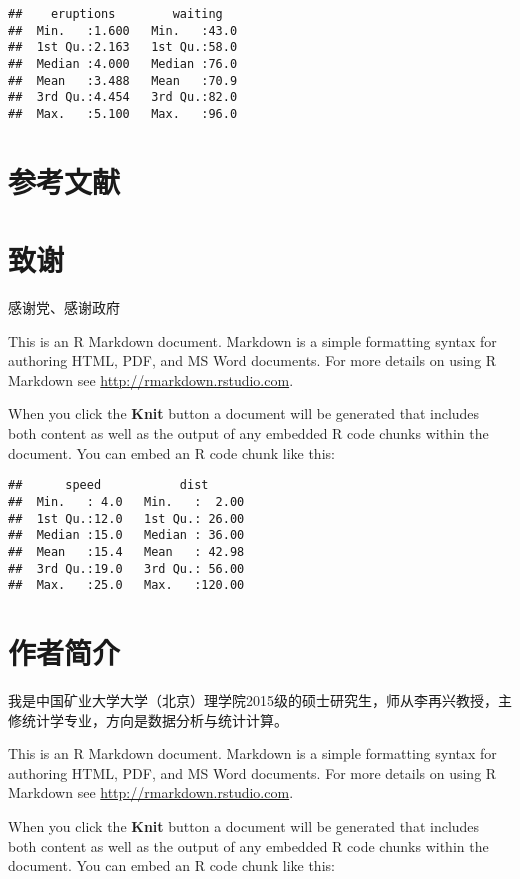 \documentclass[a4paper,11pt,]{ctexbook}
\theoremstyle{definition}
\theoremstyle{definition}
\theoremstyle{definition}
\theoremstyle{remark}
\begin{document}
\begin{verbatim}
##    eruptions        waiting    
##  Min.   :1.600   Min.   :43.0  
##  1st Qu.:2.163   1st Qu.:58.0  
##  Median :4.000   Median :76.0  
##  Mean   :3.488   Mean   :70.9  
##  3rd Qu.:4.454   3rd Qu.:82.0  
##  Max.   :5.100   Max.   :96.0
\end{verbatim}

\chapter*{参考文献}

\chapter*{致谢}\label{ack}

感谢党、感谢政府

This is an R Markdown document. Markdown is a simple formatting syntax
for authoring HTML, PDF, and MS Word documents. For more details on
using R Markdown see \url{http://rmarkdown.rstudio.com}.

When you click the \textbf{Knit} button a document will be generated
that includes both content as well as the output of any embedded R code
chunks within the document. You can embed an R code chunk like this:

\begin{verbatim}
##      speed           dist       
##  Min.   : 4.0   Min.   :  2.00  
##  1st Qu.:12.0   1st Qu.: 26.00  
##  Median :15.0   Median : 36.00  
##  Mean   :15.4   Mean   : 42.98  
##  3rd Qu.:19.0   3rd Qu.: 56.00  
##  Max.   :25.0   Max.   :120.00
\end{verbatim}

\chapter*{作者简介}\label{author}

我是中国矿业大学大学（北京）理学院2015级的硕士研究生，师从李再兴教授，主修统计学专业，方向是数据分析与统计计算。

This is an R Markdown document. Markdown is a simple formatting syntax
for authoring HTML, PDF, and MS Word documents. For more details on
using R Markdown see \url{http://rmarkdown.rstudio.com}.

When you click the \textbf{Knit} button a document will be generated
that includes both content as well as the output of any embedded R code
chunks within the document. You can embed an R code chunk like this:
\end{document}
